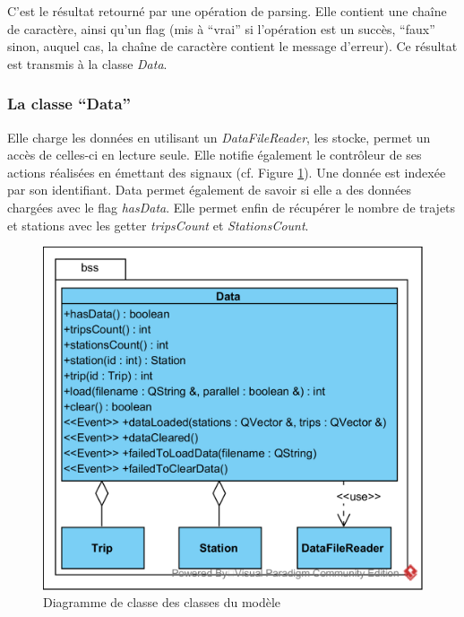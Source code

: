 \documentclass[12pt]{article}
\begin{document}
		C’est le résultat retourné par une opération de parsing. Elle contient une chaîne de caractère, ainsi qu’un flag (mis à “vrai” si l’opération est un succès, “faux” sinon, auquel cas, la chaîne de caractère contient le message d’erreur).
	Ce résultat est transmis à la classe \textit{Data}.
			
		\subsubsection{La classe “Data”}
	Elle charge les données en utilisant un \textit{DataFileReader}, les stocke, permet un accès de celles-ci en lecture seule. Elle notifie également le contrôleur de ses actions réalisées en émettant des signaux (cf. Figure \ref{fig:dia_classe_modele}). Une donnée est indexée par son identifiant. Data permet également de savoir si elle a des données chargées avec le flag \textit{hasData}. Elle permet enfin de récupérer le nombre de trajets et stations avec les getter \textit{tripsCount} et \textit{StationsCount}.
	
		\begin{figure}[!h]
		\begin{center}
		\includegraphics[scale=1]{dia_class_modele.png}
		\caption{Diagramme de classe des classes du modèle}
		\label{fig:dia_classe_modele}
		\end{center}
		\end{figure}
		
\end{document}
